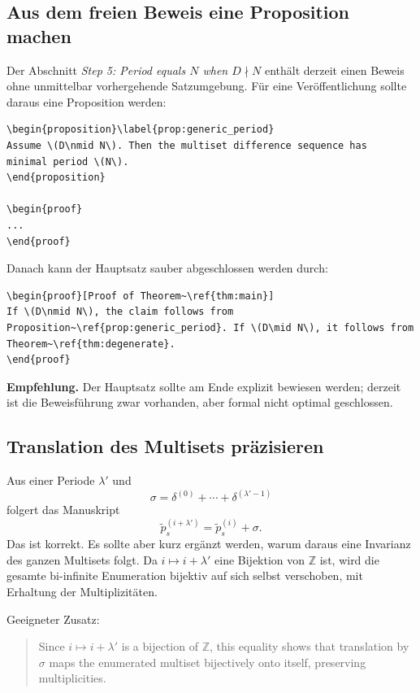 \documentclass[11pt]{article}
\newcommand{\todo}[1]{\par\medskip\noindent\textbf{Empfehlung.} #1\par\medskip}
\begin{document}
\subsection{Aus dem freien Beweis eine Proposition machen}

Der Abschnitt \emph{Step 5: Period equals \(N\) when \(D\nmid N\)} enthält derzeit einen Beweis ohne unmittelbar vorhergehende Satzumgebung. Für eine Veröffentlichung sollte daraus eine Proposition werden:

\begin{verbatim}
\begin{proposition}\label{prop:generic_period}
Assume \(D\nmid N\). Then the multiset difference sequence has
minimal period \(N\).
\end{proposition}

\begin{proof}
...
\end{proof}
\end{verbatim}

Danach kann der Hauptsatz sauber abgeschlossen werden durch:

\begin{verbatim}
\begin{proof}[Proof of Theorem~\ref{thm:main}]
If \(D\nmid N\), the claim follows from
Proposition~\ref{prop:generic_period}. If \(D\mid N\), it follows from
Theorem~\ref{thm:degenerate}.
\end{proof}
\end{verbatim}

\todo{Der Hauptsatz sollte am Ende explizit bewiesen werden; derzeit ist die Beweisführung zwar vorhanden, aber formal nicht optimal geschlossen.}

\subsection{Translation des Multisets präzisieren}

Aus einer Periode \(\lambda'\) und
\[
    \sigma=\delta^{(0)}+\cdots+\delta^{(\lambda'-1)}
\]
folgert das Manuskript
\[
    \tilde p_s^{(i+\lambda')}=\tilde p_s^{(i)}+\sigma.
\]
Das ist korrekt. Es sollte aber kurz ergänzt werden, warum daraus eine Invarianz des ganzen Multisets folgt. Da \(i\mapsto i+\lambda'\) eine Bijektion von \(\mathbb Z\) ist, wird die gesamte bi-infinite Enumeration bijektiv auf sich selbst verschoben, mit Erhaltung der Multiplizitäten.

Geeigneter Zusatz:

\begin{quote}
Since \(i\mapsto i+\lambda'\) is a bijection of \(\mathbb Z\), this equality shows that translation by \(\sigma\) maps the enumerated multiset bijectively onto itself, preserving multiplicities.
\end{quote}
\end{document}
